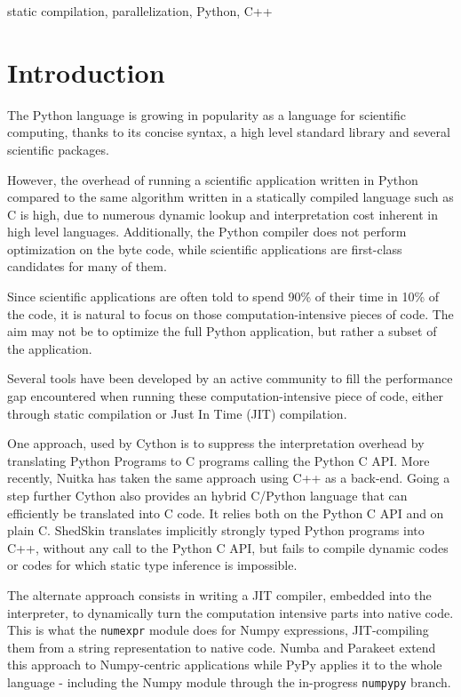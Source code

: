 \documentclass[10pt, onecolumn, preprint]{sigplanconf}
\begin{document}
\keywords
static compilation, parallelization, Python, C++


\section{Introduction}

The Python language is growing in popularity as a language for scientific
computing, thanks to %
 its concise syntax, a high level standard library and
several scientific packages.

However, the overhead of running a scientific application written in Python
compared to the same algorithm written in a statically compiled language such
as C is high, %
due to numerous dynamic lookup and interpretation cost inherent
in high level languages. Additionally, the Python compiler does not perform
optimization on the byte code, while scientific applications are first-class
candidates for many of them.

Since scientific applications are often told to spend 90\% of their time in
10\% of the code, it is natural to focus on those computation-intensive pieces 
of code. The aim %
may not be to optimize the full Python application, but rather a subset of the application.

Several tools have been developed by an active community to fill the performance
gap encountered when running these computation-intensive piece of code, either
through static compilation or Just In Time (JIT) compilation.

One approach, used by Cython \cite{cython2010} is to suppress the interpretation
overhead by translating Python Programs to C programs calling the Python C
API\cite{pythoncapi}. More recently, Nuitka\cite{nuitka}  has taken the same
approach using C++ as a back-end. Going a step further Cython also provides an
hybrid C/Python language that can efficiently be translated into C code. It 
relies both on the Python C API and on plain C.
ShedSkin\cite{shedskin2006} translates implicitly strongly typed Python programs
into C++, without any call to the Python C API, but fails to compile dynamic
codes or codes for which static type inference is impossible.

The alternate approach consists in writing a JIT compiler, embedded into the
interpreter, to dynamically turn the computation intensive parts into native
code. This is what the \texttt{numexpr} module\cite{numexpr} does for Numpy 
expressions, JIT-compiling them from a string representation to native code.
Numba\cite{numba} and Parakeet\cite{parakeet2012} extend this approach to
Numpy-centric applications while PyPy\cite{pypy2009} applies it to the whole
language - including the Numpy module through the in-progress \texttt{numpypy}
branch.
\end{document}
